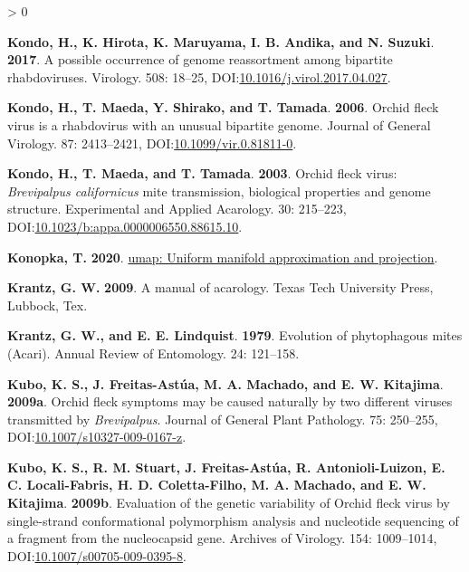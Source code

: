 \documentclass{ufdissertation}[overrideChapters] %
\newlength{\cslhangindent}
\newenvironment{CSLReferences}[2] %
 {%
  \setlength{\parindent}{0pt}
  \ifodd #1 \everypar{\setlength{\hangindent}{\cslhangindent}}\ignorespaces\fi
  \ifnum #2 > 0
  \setlength{\parskip}{#2\baselineskip}
  \fi
 }%
 {}
\begin{document}
{\begin{CSLReferences}{1}{1}
\leavevmode{}%
\textbf{Kondo, H., K. Hirota, K. Maruyama, I. B. Andika, and N. Suzuki}. \textbf{2017}. A possible occurrence of genome reassortment among bipartite rhabdoviruses. Virology. 508: 18--25, DOI:\href{https://doi.org/10.1016/j.virol.2017.04.027}{10.1016/j.virol.2017.04.027}.

\leavevmode{}%
\textbf{Kondo, H., T. Maeda, Y. Shirako, and T. Tamada}. \textbf{2006}. {Orchid fleck virus} is a rhabdovirus with an unusual bipartite genome. Journal of General Virology. 87: 2413--2421, DOI:\href{https://doi.org/10.1099/vir.0.81811-0}{10.1099/vir.0.81811-0}.

\leavevmode{}%
\textbf{Kondo, H., T. Maeda, and T. Tamada}. \textbf{2003}. {Orchid fleck virus}: {\emph{Brevipalpus californicus}} mite transmission, biological properties and genome structure. Experimental and Applied Acarology. 30: 215--223, DOI:\href{https://doi.org/10.1023/b:appa.0000006550.88615.10}{10.1023/b:appa.0000006550.88615.10}.

\leavevmode{}%
\textbf{Konopka, T.} \textbf{2020}. \href{https://CRAN.R-project.org/package=umap}{{umap}: Uniform manifold approximation and projection}.

\leavevmode{}%
\textbf{Krantz, G. W.} \textbf{2009}. A manual of acarology. Texas Tech University Press, Lubbock, Tex.

\leavevmode{}%
\textbf{Krantz, G. W., and E. E. Lindquist}. \textbf{1979}. Evolution of phytophagous mites ({Acari}). Annual Review of Entomology. 24: 121--158.

\leavevmode{}%
\textbf{Kubo, K. S., J. Freitas-Astúa, M. A. Machado, and E. W. Kitajima}. \textbf{2009a}. {Orchid fleck} symptoms may be caused naturally by two different viruses transmitted by {\emph{Brevipalpus}}. Journal of General Plant Pathology. 75: 250--255, DOI:\href{https://doi.org/10.1007/s10327-009-0167-z}{10.1007/s10327-009-0167-z}.

\leavevmode{}%
\textbf{Kubo, K. S., R. M. Stuart, J. Freitas-Astúa, R. Antonioli-Luizon, E. C. Locali-Fabris, H. D. Coletta-Filho, M. A. Machado, and E. W. Kitajima}. \textbf{2009b}. Evaluation of the genetic variability of {Orchid fleck virus} by single-strand conformational polymorphism analysis and nucleotide sequencing of a fragment from the nucleocapsid gene. Archives of Virology. 154: 1009--1014, DOI:\href{https://doi.org/10.1007/s00705-009-0395-8}{10.1007/s00705-009-0395-8}.


\end{CSLReferences}}
\end{document}
